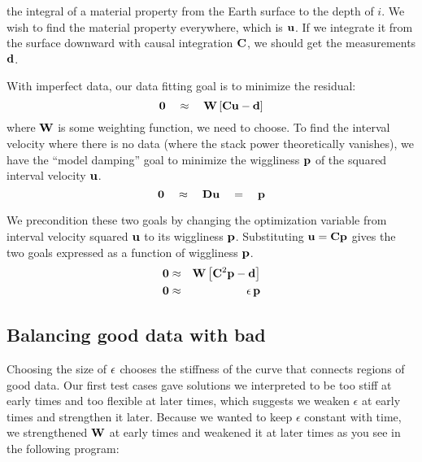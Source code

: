 the integral of a material property from the Earth surface to the depth of $i$.
We wish to find the material property everywhere, which is $\bold u$.
If we integrate it from the surface downward with causal integration $\bold C$,
we should get the measurements $\bold d$.
\par
With imperfect data, our data fitting goal is to minimize the residual:
\begin{equation}
\bold 0
\quad\approx\quad
\bold W
\left[
\bold C\bold u
-
\bold d
\right]
\end{equation}
where $\bold W$ is some weighting function,
we need to choose.
To find the interval velocity
where there is no data (where the stack power theoretically vanishes),
we have the ``model damping'' goal to minimize
the wiggliness $\bold p$
of the squared interval velocity $\bold u$.
\begin{equation}
\bold 0
\quad\approx\quad
\bold D \bold u \quad =\quad \bold p
\end{equation}
\par
We precondition these two goals
by changing the optimization variable from
interval velocity squared
$\bold u$ to its wiggliness $\bold p$.
Substituting $\bold u=\bold C\bold p$ gives the two goals
expressed as a function of wiggliness $\bold p$.
\begin{eqnarray}
\label{eqn:model}
\bold 0
&\approx&
\bold W
\left[
\bold C^2\bold p
-
\bold d
\right]
\\
\bold 0
&\approx&
\epsilon \, \bold p
\end{eqnarray}
\subsection{Balancing good data with bad}
Choosing the size of $\bold \epsilon$ chooses
the stiffness of the curve that connects regions of good data.
Our first test cases gave solutions
we interpreted to be
too stiff at early times and too flexible at later times,
which suggests we weaken $\epsilon$ at early times and strengthen it later.
Because we wanted to keep $\epsilon$ constant with time,
we strengthened $\bold W$ at early times
and weakened it at later times
as you see in the following program:




